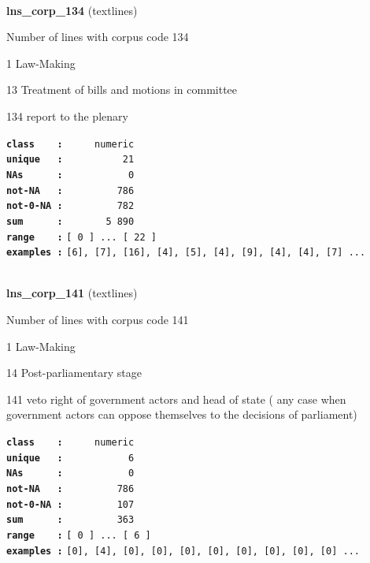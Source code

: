 \documentclass[]{article}
\begin{document}
~

\textbf{lns\_corp\_134} (textlines)

Number of lines with corpus code 134

1 Law-Making

13 Treatment of bills and motions in committee

134 report to the plenary

\textbf{\texttt{class\ \ \ \ :}} \texttt{~~~~~numeric}\\
\textbf{\texttt{unique\ \ \ :}} \texttt{~~~~~~~~~~21}\\
\textbf{\texttt{NAs\ \ \ \ \ \ :}} \texttt{~~~~~~~~~~~0}\\
\textbf{\texttt{not-NA\ \ \ :}} \texttt{~~~~~~~~~786}\\
\textbf{\texttt{not-0-NA\ :}} \texttt{~~~~~~~~~782}\\
\textbf{\texttt{sum\ \ \ \ \ \ :}} \texttt{~~~~~~~5~890}\\
\textbf{\texttt{range\ \ \ \ :}}
\texttt{{[}\ 0\ {]}\ ...\ {[}\ 22\ {]}}\\
\textbf{\texttt{examples\ :}}
\texttt{{[}6{]},\ {[}7{]},\ {[}16{]},\ {[}4{]},\ {[}5{]},\ {[}4{]},\ {[}9{]},\ {[}4{]},\ {[}4{]},\ {[}7{]}\ ...}\\

~

\textbf{lns\_corp\_141} (textlines)

Number of lines with corpus code 141

1 Law-Making

14 Post-parliamentary stage

141 veto right of government actors and head of state ( any case when
government actors can oppose themselves to the decisions of parliament)

\textbf{\texttt{class\ \ \ \ :}} \texttt{~~~~~numeric}\\
\textbf{\texttt{unique\ \ \ :}} \texttt{~~~~~~~~~~~6}\\
\textbf{\texttt{NAs\ \ \ \ \ \ :}} \texttt{~~~~~~~~~~~0}\\
\textbf{\texttt{not-NA\ \ \ :}} \texttt{~~~~~~~~~786}\\
\textbf{\texttt{not-0-NA\ :}} \texttt{~~~~~~~~~107}\\
\textbf{\texttt{sum\ \ \ \ \ \ :}} \texttt{~~~~~~~~~363}\\
\textbf{\texttt{range\ \ \ \ :}}
\texttt{{[}\ 0\ {]}\ ...\ {[}\ 6\ {]}}\\
\textbf{\texttt{examples\ :}}
\texttt{{[}0{]},\ {[}4{]},\ {[}0{]},\ {[}0{]},\ {[}0{]},\ {[}0{]},\ {[}0{]},\ {[}0{]},\ {[}0{]},\ {[}0{]}\ ...}\\
\end{document}
